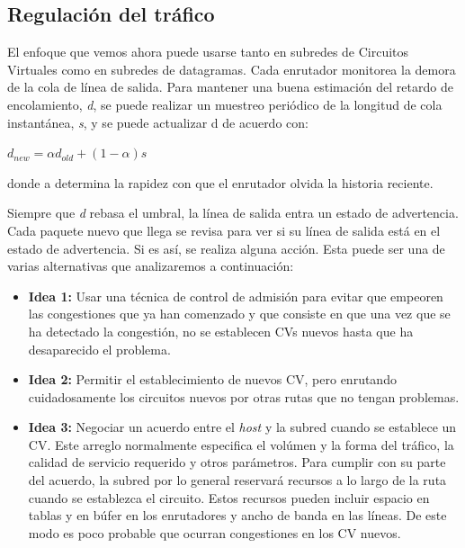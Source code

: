 \subsection{Regulación del tráfico}

	\par El enfoque que vemos ahora puede usarse tanto en subredes de Circuitos Virtuales como en subredes de datagramas. Cada enrutador monitorea la demora de la cola de línea de salida. Para mantener una buena estimación del retardo de encolamiento, \textit{d}, se puede realizar un muestreo periódico de la longitud de cola instantánea, \textit{s}, y se puede actualizar d de acuerdo con:

	\begin{center}
		$ d_{new} = \alpha d_{old} + (1-\alpha) s $
	\end{center}

	\par donde a determina la rapidez con que el enrutador olvida la historia reciente.

	\par Siempre que \textit{d} rebasa el umbral, la línea de salida entra un estado de advertencia. Cada paquete nuevo que llega se revisa para ver si su línea de salida está en el estado de advertencia. Si es así, se realiza alguna acción. Esta puede ser una de varias alternativas que analizaremos a continuación:

	\begin{itemize}
		\item \textbf{Idea 1:} Usar una técnica de control de admisión para evitar que empeoren las congestiones que ya han comenzado y que consiste en que una vez que se ha detectado la congestión, no se establecen CVs nuevos hasta que ha desaparecido el problema.
		\item \textbf{Idea 2:} Permitir el establecimiento de nuevos CV, pero enrutando cuidadosamente los circuitos nuevos por otras rutas que no tengan problemas.

		\item \textbf{Idea 3:} Negociar un acuerdo entre el \textit{host} y la subred cuando se establece un CV. Este arreglo normalmente especifica el volúmen y la forma del tráfico, la calidad de servicio requerido y otros parámetros. Para cumplir con su parte del acuerdo, la subred por lo general reservará recursos a lo largo de la ruta cuando se establezca el circuito. Estos recursos pueden incluir espacio en tablas y en búfer en los enrutadores y ancho de banda en las líneas. De este modo es poco probable que ocurran congestiones en los CV nuevos.
	\end{itemize}

